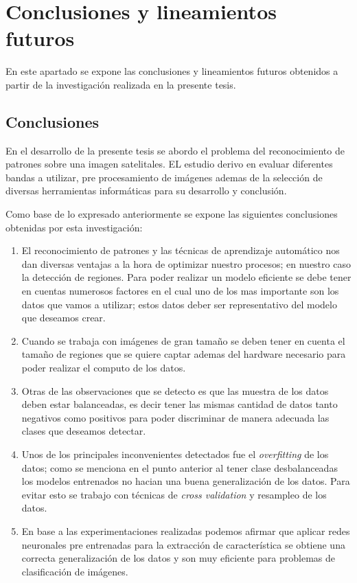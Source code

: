 \chapter{Conclusiones y lineamientos futuros}\label{chap:conclusiones}
En este apartado se expone las conclusiones y lineamientos futuros obtenidos a partir de la investigación realizada en la presente tesis. 

\section{Conclusiones}
En el desarrollo de la presente tesis se abordo el problema del reconocimiento de patrones sobre una imagen satelitales. EL estudio derivo en evaluar diferentes bandas a utilizar, pre procesamiento de imágenes ademas de la selección de diversas herramientas informáticas para su desarrollo y conclusión.

Como base de lo expresado anteriormente se expone las siguientes conclusiones obtenidas por esta investigación:
\begin{enumerate}
\item El reconocimiento de patrones y las técnicas de aprendizaje automático nos dan diversas ventajas a la hora de optimizar nuestro procesos; en nuestro caso la detección de regiones. Para poder realizar un modelo eficiente se debe tener en cuentas numerosos factores en el cual uno de los mas importante son los datos que vamos a utilizar; estos datos deber ser representativo del modelo que deseamos crear.

\item Cuando se trabaja con imágenes de gran tamaño se deben tener en cuenta el tamaño de regiones que se quiere captar ademas del hardware necesario para poder realizar el computo de los datos.

\item Otras de las observaciones que se detecto es que las muestra de los datos deben estar balanceadas, es decir tener las mismas cantidad de datos tanto negativos como positivos para poder discriminar de manera adecuada las clases que deseamos detectar.

\item Unos de los principales inconvenientes detectados fue el \textit{overfitting} de los datos; como se menciona en el punto anterior al tener clase desbalanceadas los modelos entrenados no hacian una buena generalización de los datos. Para evitar esto se trabajo con técnicas de \textit{cross validation} y resampleo de los datos.

\item En base a las experimentaciones realizadas podemos afirmar que aplicar redes neuronales pre entrenadas para la extracción de característica se obtiene una correcta generalización de los datos y son muy eficiente para problemas de clasificación de imágenes.

\end{enumerate}


